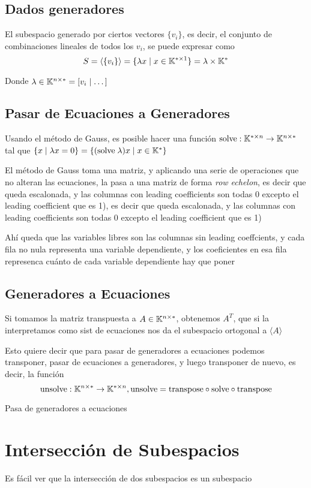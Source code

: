 \documentclass{article}
\begin{document}
\subsection{Dados generadores}
El subespacio generado por ciertos vectores $\{v_i\}$, es decir, el conjunto de
combinaciones lineales de todos los $v_i$, se puede expresar como
\[S = \langle \{v_i\} \rangle = \{\lambda x \mid x \in \mathbb{K} ^ {*\times 1}\}
= \lambda \times \mathbb{K}^*\]

Donde $\lambda \in \mathbb{K} ^ {n \times *}= [v_i \mid \dots]$

\subsection{Pasar de Ecuaciones a Generadores}
Usando el método de Gauss, es posible hacer una función $\text{solve} : \mathbb{K}^{*\times n} \to
\mathbb{K}^{n \times *}$ tal que $\{x \mid \lambda x = 0\} = \{(\text{solve} \;\lambda)
x \mid x \in \mathbb{K}^*\}$

El método de Gauss toma una matriz, y aplicando una serie de operaciones que no
alteran las ecuaciones, la pasa a una matriz de forma \emph{row echelon}, es decir
que queda escalonada, y las columnas con leading coefficients son todas 0 excepto
el leading coefficient que es 1), es decir
que queda escalonada, y las columnas con leading coefficients son todas 0 excepto
el leading coefficient que es 1)

Ahí queda que las variables libres son las columnas sin leading coeffcients, y
cada fila no nula representa una variable dependiente, y los coeficientes en
esa fila represenca cuánto de cada variable dependiente hay que poner

\subsection{Generadores a Ecuaciones}
Si tomamos la matriz transpuesta a $A \in \mathbb{K}^{n \times *}$, obtenemos
$A^T$, que si la interpretamos como sist de ecuaciones nos da el subespacio
ortogonal a $\langle A \rangle$

Esto quiere decir que para pasar de generadores a ecuaciones podemos
transponer, pasar de ecuaciones a generadores, y luego transponer de nuevo,
es decir, la función
\[\text{unsolve} : \mathbb{K}^{n\times *} \to \mathbb{K}^{* \times n}, \text{unsolve} =
\text{transpose} \circ \text{solve} \circ \text{transpose}\]

Pasa de generadores a ecuaciones

\section{Intersección de Subespacios}
Es fácil ver que la intersección de dos subespacios es un subespacio
\end{document}
